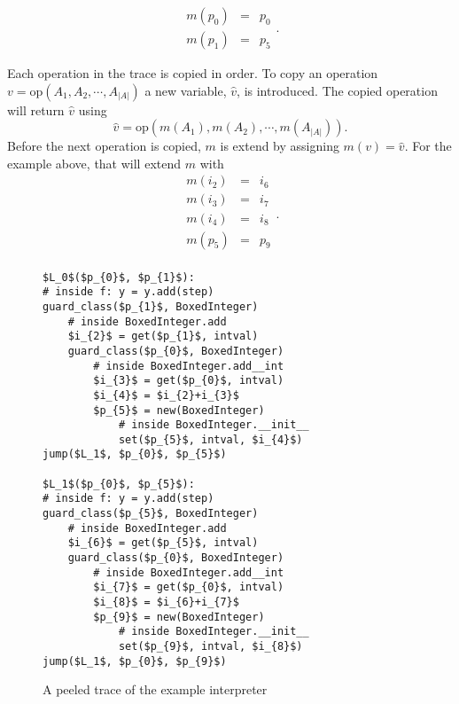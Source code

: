 \documentclass[preprint]{sigplanconf}
\begin{document}
\begin{equation}
    \begin{array}{lcl}
      m\left(p_0\right) &=& p_0 \\
      m\left(p_1\right) &=& p_5
    \end{array}
  .
\end{equation}



Each operation in the trace is copied in order.
To copy an operation $v=\text{op}\left(A_1, A_2, \cdots, A_{|A|}\right)$
a new variable, $\hat v$, is introduced. The copied operation will
return $\hat v$ using
\begin{equation}
  \hat v = \text{op}\left(m\left(A_1\right), m\left(A_2\right), 
    \cdots, m\left(A_{|A|}\right)\right) . 
\end{equation}
Before the
next operation is copied, $m$ is extend by assigning $m\left(v\right) = \hat
v$. For the example above, that will extend $m$ with
\begin{equation}
    \begin{array}{lcl}
      m\left(i_2\right) &=& i_6 \\
      m\left(i_3\right) &=& i_7 \\
      m\left(i_4\right) &=& i_8 \\
      m\left(p_5\right) &=& p_9 \\
    \end{array}
  .
\end{equation}

\begin{figure}
\begin{lstlisting}[mathescape,numbers = right,basicstyle=\setstretch{1.05}\ttfamily\scriptsize]
$L_0$($p_{0}$, $p_{1}$):
# inside f: y = y.add(step)
guard_class($p_{1}$, BoxedInteger)
    # inside BoxedInteger.add
    $i_{2}$ = get($p_{1}$, intval)
    guard_class($p_{0}$, BoxedInteger)
        # inside BoxedInteger.add__int
        $i_{3}$ = get($p_{0}$, intval)
        $i_{4}$ = $i_{2}+i_{3}$
        $p_{5}$ = new(BoxedInteger)
            # inside BoxedInteger.__init__
            set($p_{5}$, intval, $i_{4}$)
jump($L_1$, $p_{0}$, $p_{5}$)

$L_1$($p_{0}$, $p_{5}$):
# inside f: y = y.add(step)
guard_class($p_{5}$, BoxedInteger)
    # inside BoxedInteger.add
    $i_{6}$ = get($p_{5}$, intval)
    guard_class($p_{0}$, BoxedInteger)
        # inside BoxedInteger.add__int
        $i_{7}$ = get($p_{0}$, intval)
        $i_{8}$ = $i_{6}+i_{7}$
        $p_{9}$ = new(BoxedInteger)
            # inside BoxedInteger.__init__
            set($p_{9}$, intval, $i_{8}$)
jump($L_1$, $p_{0}$, $p_{9}$)
\end{lstlisting}
\caption{A peeled trace of the example interpreter}
\label{fig:peeled-trace}
\end{figure}
\end{document}
